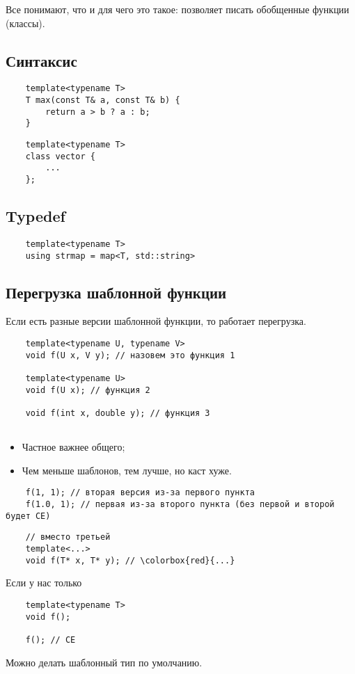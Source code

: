 \documentclass[12pt]{article}
\begin{document}
Все понимают, что и для чего это такое: позволяет писать обобщенные функции (классы). 

\subsection{Синтаксис}

\begin{lstlisting}
	template<typename T> 
	T max(const T& a, const T& b) {
		return a > b ? a : b;
	}
\end{lstlisting}

\begin{lstlisting}
	template<typename T>
	class vector {
		...
	};
\end{lstlisting}

\subsection{Typedef}

\begin{lstlisting}
	template<typename T>
	using strmap = map<T, std::string>
\end{lstlisting}

\subsection{Перегрузка шаблонной функции}

Если есть разные версии шаблонной функции, то работает перегрузка. 

\begin{lstlisting}
	template<typename U, typename V>
	void f(U x, V y); // назовем это функция 1
	
	template<typename U>
	void f(U x); // функция 2
	
	void f(int x, double y); // функция 3
	
\end{lstlisting}

\begin{itemize}
	\item Частное важнее общего;
	\item Чем меньше шаблонов, тем лучше, но каст хуже. 
\end{itemize}

\begin{lstlisting}
	f(1, 1); // вторая версия из-за первого пункта
	f(1.0, 1); // первая из-за второго пункта (без первой и второй будет CE)
\end{lstlisting}

\begin{lstlisting}
	// вместо третьей
	template<...>
	void f(T* x, T* y); // \colorbox{red}{...}
\end{lstlisting}

Если у нас только

\begin{lstlisting}
	template<typename T>
	void f();
	
	f(); // CE
\end{lstlisting}

Можно делать шаблонный тип по умолчанию. 
\end{document}
